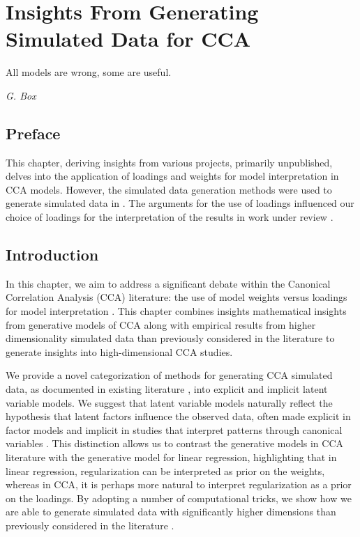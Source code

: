\graphicspath{{chapters/loadings/}}


\chapter{Insights From Generating Simulated Data for CCA}\label{ch:loadings}
\epigraph{All models are wrong, some are useful.}{\textit{G. Box}}
\minitoc
\section*{Preface}

This chapter, deriving insights from various projects, primarily unpublished, delves into the application of loadings and weights for model interpretation in CCA models.
However, the simulated data generation methods were used to generate simulated data in \citet{mihalik2022canonical}.
The arguments for the use of loadings influenced our choice of loadings for the interpretation of the results in work under review \citet{adams2023}.

\section{Introduction}

In this chapter, we aim to address a significant debate within the Canonical Correlation Analysis (CCA) literature: the use of model weights versus loadings for model interpretation \citep{gu2018simultaneous}.
This chapter combines insights mathematical insights from generative models of CCA along with empirical results from higher dimensionality simulated data than previously considered in the literature to generate insights into high-dimensional CCA studies.

We provide a novel categorization of methods for generating CCA simulated data, as documented in existing literature \citep{witten2009penalized,chen2013sparse, suo2017sparse, helmer2020stability}, into explicit and implicit latent variable models.
We suggest that latent variable models naturally reflect the hypothesis that latent factors influence the observed data, often made explicit in factor models \citep{ferreira2022hierarchical, cheng2013group} and implicit in studies that interpret patterns through canonical variables \citep{mihalik2019brain, mihalik2020multiple}.
This distinction allows us to contrast the generative models in CCA literature with the generative model for linear regression, highlighting that in linear regression, regularization can be interpreted as prior on the weights, whereas in CCA, it is perhaps more natural to interpret regularization as a prior on the loadings.
By adopting a number of computational tricks, we show how we are able to generate simulated data with significantly higher dimensions than previously considered in the literature \citep{helmer2020stability, matkovivc2023static}.

